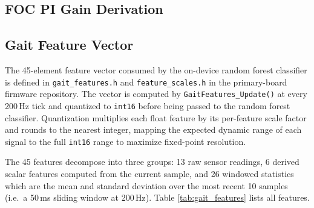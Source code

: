 \documentclass[11pt]{article}
\begin{document}
\subsection{FOC PI Gain Derivation}

\subsection{Gait Feature Vector}
\label{sec:gait_feature_vector}

The 45-element feature vector consumed by the on-device random forest classifier is defined in \texttt{gait\_features.h} and \texttt{feature\_scales.h} in the primary-board firmware repository. The vector is computed by \texttt{GaitFeatures\_Update()} at every 200\,Hz tick and quantized to \texttt{int16} before being passed to the random forest classifier. 
Quantization multiplies each float feature by its per-feature scale factor and rounds to the nearest integer, mapping the expected dynamic range of each signal to the full \texttt{int16} range to maximize fixed-point resolution.

The 45 features decompose into three groups: 13 raw sensor readings, 6 derived scalar features computed from the current sample, 
and 26 windowed statistics which are the mean and standard deviation over the most recent 10 samples (i.e.\ a 50\,ms sliding window at 200\,Hz). Table \ref{tab:gait_features} lists all features.
\end{document}
